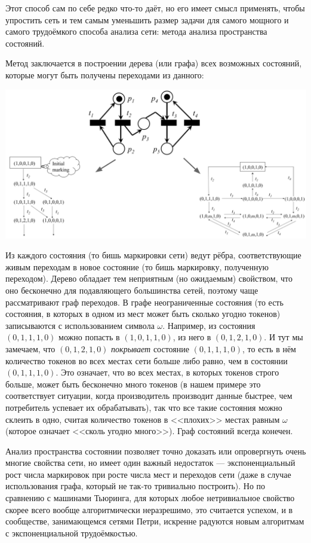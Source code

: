 \documentclass{../mcstext}
\begin{document}
Этот способ сам по себе редко что-то даёт, но его имеет смысл применять, чтобы упростить сеть и тем самым уменьшить размер задачи для самого мощного и самого трудоёмкого способа анализа сети: метода анализа пространства состояний.

Метод заключается в построении дерева (или графа) всех возможных состояний, которые могут быть получены переходами из данного:

\begin{center}
    \includegraphics[width=\textwidth]{petriStateSpaceAnalysis.png}
\end{center}

Из каждого состояния (то бишь маркировки сети) ведут рёбра, соответствующие живым переходам в новое состояние (то бишь маркировку, полученную переходом). Дерево обладает тем неприятным (но ожидаемым) свойством, что оно бесконечно для подавляющего большинства сетей, поэтому чаще рассматривают граф переходов. В графе неограниченные состояния (то есть состояния, в которых в одном из мест может быть сколько угодно токенов) записываются с использованием символа $\omega$. Например, из состояния $(0, 1, 1, 1, 0)$ можно попасть в $(1, 0, 1, 1, 0)$, из него в $(0, 1, 2, 1, 0)$. И тут мы замечаем, что $(0, 1, 2, 1, 0)$ \textit{покрывает} состояние $(0, 1, 1, 1, 0)$, то есть в нём количество токенов во всех местах сети больше либо равно, чем в состоянии $(0, 1, 1, 1, 0)$. Это означает, что во всех местах, в которых токенов строго больше, может быть бесконечно много токенов (в нашем примере это соответствует ситуации, когда производитель производит данные быстрее, чем потребитель успевает их обрабатывать), так что все такие состояния можно склеить в одно, считая количество токенов в <<плохих>> местах равным $\omega$ (которое означает <<сколь угодно много>>). Граф состояний всегда конечен.

Анализ пространства состоянии позволяет точно доказать или опровергнуть очень многие свойства сети, но имеет один важный недостаток --- экспоненциальный рост числа маркировок при росте числа мест и переходов сети (даже в случае использования графа, который не так-то тривиально построить). Но по сравнению с машинами Тьюринга, для которых любое нетривиальное свойство скорее всего вообще алгоритмически неразрешимо, это считается успехом, и в сообществе, занимающемся сетями Петри, искренне радуются новым алгоритмам с экспоненциальной трудоёмкостью.
\end{document}
